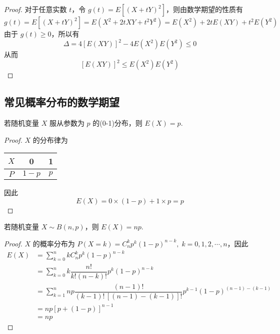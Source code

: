 \begin{proof}
    对于任意实数 $t$，令 $g(t) = E[(X+tY)^2]$，则由数学期望的性质有
    $$
    g(t) = E[(X+tY)^2] = E(X^2 + 2tXY + t^2 Y^2) = E(X^2) + 2tE(XY) + t^2 E(Y^2)
    $$
    由于 $g(t) \geqslant 0$，所以有
    $$
    \varDelta = 4 [E(XY)]^2 - 4 E(X^2) E(Y^2) \leqslant 0
    $$
    从而
    $$
    [E(XY)]^2 \leqslant E(X^2) E(Y^2)
    $$
\end{proof}

\subsection{常见概率分布的数学期望}

\begin{conclusion}
    \indent 若随机变量 $X$ 服从参数为 $p$ 的(0-1)分布，则 $E(X) = p$.
\end{conclusion}

\begin{proof}
    $X$ 的分布律为

    \begin{center}
        \begin{tabular}{c | c c}
            \hline
            $X$ & 0 & 1 \\
            \hline
            $P$ & $1-p$ & $p$ \\
            \hline
        \end{tabular}
    \end{center}

    因此
    $$
    E(X) = 0 \times (1-p) + 1 \times p = p
    $$
\end{proof}

\begin{conclusion}
    \indent 若随机变量 $X \sim B(n,p)$，则 $E(X) = np$.
\end{conclusion}

\begin{proof}
    $X$ 的概率分布为 $P(X=k) = C_n^k p^k (1-p)^{n-k}, \; k=0,1,2,\cdots,n$，因此
    $$
    \begin{aligned}
        E(X) &= \sum_{k=0}^n k C_n^k p^k (1-p)^{n-k} \\
        &= \sum_{k=0}^n k \dfrac{n!}{k! (n-k)!} p^k (1-p)^{n-k} \\
        &= \sum_{k=1}^n np \dfrac{(n-1)!}{(k-1)! \, [(n-1)-(k-1)]!} p^{k-1} (1-p)^{(n-1)-(k-1)} \\
        &= np[p+(1-p)]^{n-1} \\
        &= np
    \end{aligned}
    $$
\end{proof}


